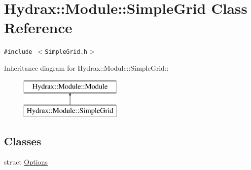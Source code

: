 \hypertarget{class_hydrax_1_1_module_1_1_simple_grid}{
\section{Hydrax::Module::SimpleGrid Class Reference}
\label{class_hydrax_1_1_module_1_1_simple_grid}
}
{\tt \#include $<$SimpleGrid.h$>$}

Inheritance diagram for Hydrax::Module::SimpleGrid::\begin{figure}[H]
\begin{center}
\leavevmode
\includegraphics[height=2cm]{class_hydrax_1_1_module_1_1_simple_grid}
\end{center}
\end{figure}
\subsection*{Classes}
\begin{CompactItemize}
\item 
struct \hyperlink{struct_hydrax_1_1_module_1_1_simple_grid_1_1_options}{Options}
\end{CompactItemize}
